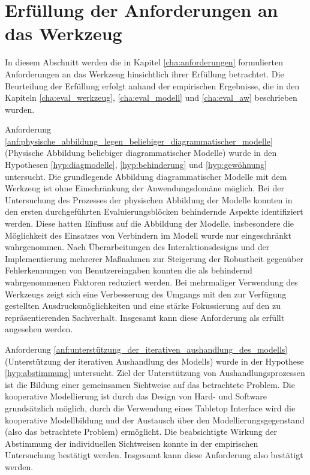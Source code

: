 \section{Erfüllung der Anforderungen an das Werkzeug}
\label{sec:erfüllung_der_anforderungen_an_das_werkzeug}

In diesem Abschnitt werden die in Kapitel \ref{cha:anforderungen} formulierten Anforderungen an das Werkzeug hinsichtlich ihrer Erfüllung betrachtet. Die Beurteilung der Erfüllung erfolgt anhand der empirischen Ergebnisse, die in den Kapiteln \ref{cha:eval_werkzeug}, \ref{cha:eval_modell} und \ref{cha:eval_aw} beschrieben wurden.

Anforderung \ref{anf:physische_abbildung_legen_beliebiger_diagrammatischer_modelle} (Physische Abbildung beliebiger diagrammatischer Modelle) wurde in den Hypothesen \ref{hyp:diagmodelle}, \ref{hyp:behinderung} und \ref{hyp:gewöhnung} untersucht. Die grundlegende Abbildung diagrammatischer Modelle mit dem Werkzeug ist ohne Einschränkung der Anwendungsdomäne möglich. Bei der Untersuchung des Prozesses der physischen Abbildung der Modelle konnten in den ersten durchgeführten Evaluierungsblöcken behindernde Aspekte identifiziert werden. Diese hatten Einfluss auf die Abbildung der Modelle, insbesondere die Möglichkeit des Einsatzes von Verbindern im Modell wurde nur eingeschränkt wahrgenommen. Nach Überarbeitungen des Interaktionsdesigns und der Implementierung mehrerer Maßnahmen zur Steigerung der Robustheit gegenüber Fehlerkennungen von Benutzereingaben konnten die als behindernd wahrgenommenen Faktoren reduziert werden. Bei mehrmaliger Verwendung des Werkzeugs zeigt sich eine Verbesserung des Umgangs mit den zur Verfügung gestellten Ausdrucksmöglichkeiten und eine stärke Fokussierung auf den zu repräsentierenden Sachverhalt. Insgesamt kann diese Anforderung als erfüllt angesehen werden.

Anforderung \ref{anf:unterstützung_der_iterativen_aushandlung_des_modells} (Unterstützung der iterativen Aushandlung des Modells) wurde in der Hypothese \ref{hyp:abstimmung} untersucht. Ziel der Unterstützung von Aushandlungsprozessen ist die Bildung einer gemeinsamen Sichtweise auf das betrachtete Problem. Die kooperative Modellierung ist durch das Design von Hard- und Software grundsätzlich möglich, durch die Verwendung eines Tabletop Interface wird die kooperative Modellbildung und der Austausch über den Modellierungsgegenstand (also das betrachtete Problem) ermöglicht. Die beabsichtigte Wirkung der Abstimmung der individuellen Sichtweisen konnte in der empirischen Untersuchung bestätigt werden. Insgesamt kann diese Anforderung also bestätigt werden.

